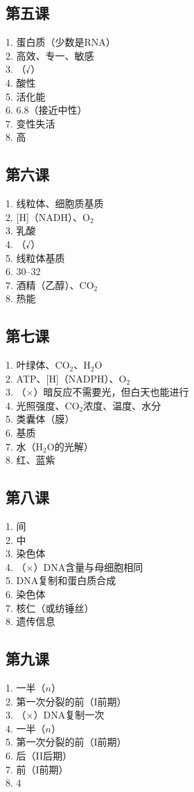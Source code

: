 \documentclass[a4paper,12pt]{ctexart}
\begin{document}
\subsection*{第五课}
1. 蛋白质（少数是RNA）\\
2. 高效、专一、敏感\\
3. （√）\\
4. 酸性\\
5. 活化能\\
6. 6.8（接近中性）\\
7. 变性失活\\
8. 高

\subsection*{第六课}
1. 线粒体、细胞质基质\\
2. [H]（NADH）、O$_2$\\
3. 乳酸\\
4. （√）\\
5. 线粒体基质\\
6. 30--32\\
7. 酒精（乙醇）、CO$_2$\\
8. 热能

\subsection*{第七课}
1. 叶绿体、CO$_2$、H$_2$O\\
2. ATP、[H]（NADPH）、O$_2$\\
3. （×）暗反应不需要光，但白天也能进行\\
4. 光照强度、CO$_2$浓度、温度、水分\\
5. 类囊体（膜）\\
6. 基质\\
7. 水（H$_2$O的光解）\\
8. 红、蓝紫

\subsection*{第八课}
1. 间\\
2. 中\\
3. 染色体\\
4. （×）DNA含量与母细胞相同\\
5. DNA复制和蛋白质合成\\
6. 染色体\\
7. 核仁（或纺锤丝）\\
8. 遗传信息

\subsection*{第九课}
1. 一半（$n$）\\
2. 第一次分裂的前（I前期）\\
3. （×）DNA复制一次\\
4. 一半（$n$）\\
5. 第一次分裂的前（I前期）\\
6. 后（II后期）\\
7. 前（I前期）\\
8. 4
\end{document}
